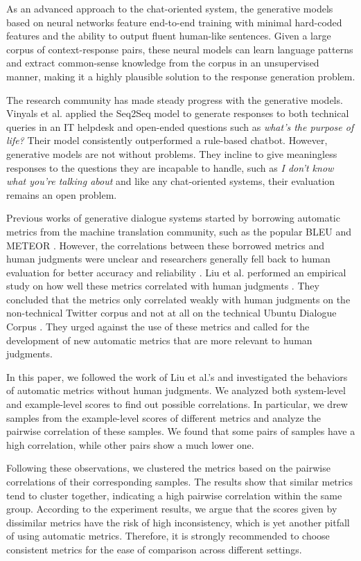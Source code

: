 \documentclass[conference]{IEEEtran}
\begin{document}
    As an advanced approach to the chat-oriented system, the generative models based on neural networks feature end-to-end training with minimal hard-coded features and the ability to output fluent human-like sentences. Given a large corpus of context-response pairs, these neural models can learn language patterns and extract common-sense knowledge from the corpus in an unsupervised manner, making it a highly plausible solution to the response generation problem.

    The research community has made steady progress with the generative models. Vinyals et al. \cite{GoogleChatbot} applied the Seq2Seq model \cite{Seq2Seq} to generate responses to both technical queries in an IT helpdesk and open-ended questions such as \textit{what's the purpose of life?} Their model consistently outperformed a rule-based chatbot. However, generative models are not without problems. They incline to give meaningless responses to the questions they are incapable to handle, such as \textit{I don't know what you're talking about} and like any chat-oriented systems, their evaluation remains an open problem.

    Previous works of generative dialogue systems started by borrowing automatic metrics from the machine translation community, such as the popular BLEU \cite{BLEU} and METEOR \cite{METEOR}. However, the correlations between these borrowed metrics and human judgments were unclear and researchers generally fell back to human evaluation for better accuracy and reliability \cite{Shang,DCGM,VHRED}. Liu et al. performed an empirical study on how well these metrics correlated with human judgments \cite{HowNot}. They concluded that the metrics only correlated weakly with human judgments on the non-technical Twitter corpus and not at all on the technical Ubuntu Dialogue Corpus \cite{ubuntu_corpus}. They urged against the use of these metrics and called for the development of new automatic metrics that are more relevant to human judgments.

    In this paper, we followed the work of Liu et al.'s and investigated the behaviors of automatic metrics without human judgments. We analyzed both system-level and example-level scores to find out possible correlations. In particular, we drew samples from the example-level scores of different metrics and analyze the pairwise correlation of these samples. We found that some pairs of samples have a high correlation, while other pairs show a much lower one.

    Following these observations, we clustered the metrics based on the pairwise correlations of their corresponding samples. The results show that similar metrics tend to cluster together, indicating a high pairwise correlation within the same group. According to the experiment results, we argue that the scores given by dissimilar metrics have the risk of high inconsistency, which is yet another pitfall of using automatic metrics. Therefore, it is strongly recommended to choose consistent metrics for the ease of comparison across different settings.
\end{document}

